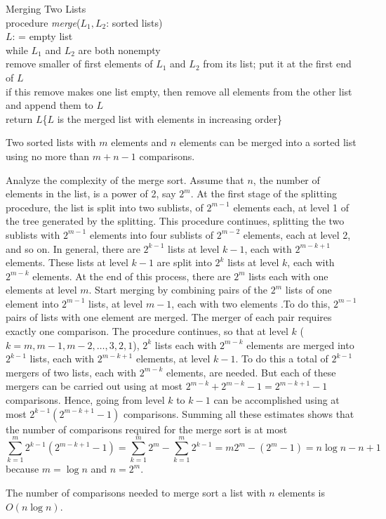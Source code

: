 \documentclass[12pt]{article}
\begin{document}
\begin{alg} Merging Two Lists \\ 
procedure \textit{merge}($L_1, L_2$: sorted lists) \\ 
$L$: = empty list \\ 
while $L_1$ and $L_2$ are both nonempty \\ 
\indent remove smaller of first elements of $L_1$ and $L_2$ from its list; put it at the first end of $L$ \\
\indent if this remove makes one list empty, then remove all elements from the other list and append them to $L$ \\ 
return $L$\{$L$ is the merged list with elements in increasing order\} \end{alg} 
\begin{theorem} Two sorted lists with $m$ elements and $n$ elements can be merged into a sorted list using no more than $m + n - 1$ comparisons. \end{theorem} 
Analyze the complexity of the merge sort. Assume that $n$, the number of elements in the list, is a power of 2, say $2^m$. At the first stage of the splitting procedure, the list is split into two sublists, of $2^{m - 1}$ elements each, at level 1 of the tree generated by the splitting. This procedure continues, splitting the two sublists with $2^{m - 1}$ elements into four sublists of $2^{m - 2}$ elements, each at level 2, and so on. In general, there are $2^{k - 1}$ lists at level $k - 1$, each with $2^{m - k + 1}$ elements. These lists at level $k - 1$ are split into $2^k$ lists at level $k$, each with $2^{m - k}$ elements. At the end of this process, there are $2^m$ lists each with one elements at level $m$. Start merging by combining pairs of the $2^m$ lists of one element into $2^{m - 1}$ lists, at level $m - 1$, each with two elements .To do this, $2^{m - 1}$ pairs of lists with one element are merged. The merger of each pair requires exactly one comparison. The procedure continues, so that at level $k$ ($k = m, m - 1, m - 2, \dots, 3, 2, 1$), $2^k$ lists each with $2^{m - k}$ elements are merged into $2^{k - 1}$ lists, each with $2^{m - k + 1}$ elements, at level $k - 1$. To do this a total of $2^{k - 1}$ mergers of two lists, each with $2^{m - k}$ elements, are needed. But each of these mergers can be carried out using at most $2^{m - k} + 2^{m - k} - 1 = 2^{m - k + 1} - 1$ comparisons. Hence, going from level $k$ to $k - 1$ can be accomplished using at most $2^{k - 1}(2^{m - k + 1} - 1)$ comparisons. Summing all these estimates shows that the number of comparisons required for the merge sort is at most $$\sum_{k = 1}^m 2^{k - 1}(2^{m - k + 1} - 1) = \sum_{k = 1}^m 2^m - \sum_{k = 1}^m 2^{k - 1} = m2^m - (2^m - 1) = n\log n - n + 1$$ because $m = \log n$ and $n = 2^m$. 
\begin{theorem} The number of comparisons needed to merge sort a list with $n$ elements is $O(n\log n)$. \end{theorem} 
\end{document}
